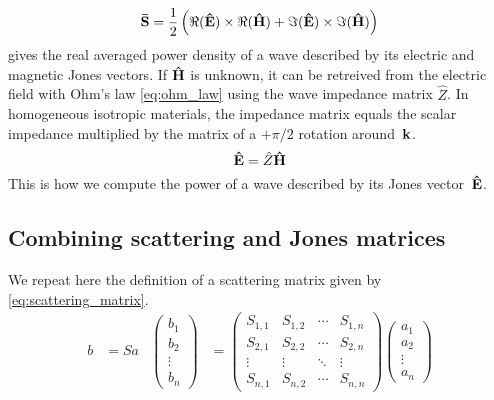 \begin{equation}
    \mathbf{\bar{S}} = \frac{1}{2}
    \left(
        \Re(\mathbf{\hat{E}}) \times \Re(\mathbf{\hat{H}}) + 
        \Im(\mathbf{\hat{E}}) \times \Im(\mathbf{\hat{H}})
    \right)
    \label{eq:poynting_from_phasors}
\end{equation}
 gives the real averaged power density of a wave described by its electric and magnetic Jones vectors.
If $\mathbf{\hat{H}}$ is unknown, it can be retreived from the electric field with Ohm's law \eqref{eq:ohm_law} using the wave impedance matrix $\hat{Z}$.
In homogeneous isotropic materials, the impedance matrix equals the scalar impedance multiplied by the matrix of a $+\pi/2$ rotation around~$\mathbf{k}$.
\begin{equation}
    \mathbf{\hat{E}} = \hat{Z} \mathbf{\hat{H}} \label{eq:ohm_law}
\end{equation}
This is how we compute the power of a wave described by its Jones vector~$\mathbf{\hat{E}}$.



\subsection{Combining scattering and Jones matrices}
We repeat here the definition of a scattering matrix given by \vref{eq:scattering_matrix}.
\begin{align*}
    b &= S a
    &
    \begin{pmatrix}
        b_1\\
        b_2\\
        \vdots\\
        b_n
    \end{pmatrix}
    &=
    \begin{pmatrix}
        S_{1, 1} & S_{1, 2} & \cdots & S_{1, n} \\
        S_{2, 1} & S_{2, 2} & \cdots & S_{2, n} \\
        \vdots   & \vdots   & \ddots & \vdots   \\
        S_{n, 1} & S_{n, 2} & \cdots & S_{n, n}
    \end{pmatrix}
    \begin{pmatrix}
        a_1\\
        a_2\\
        \vdots\\
        a_n
    \end{pmatrix}
\end{align*}


